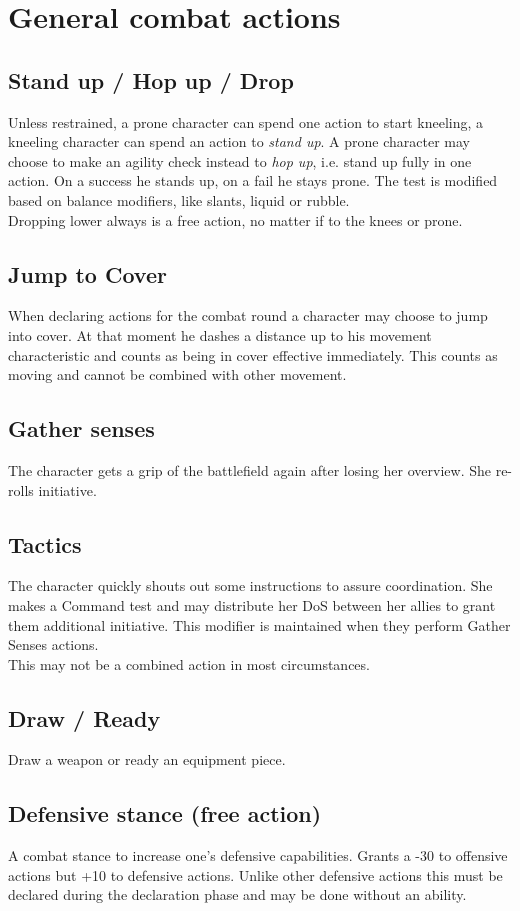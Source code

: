 \pagebreak
\section{General combat actions}
\subsection*{Stand up / Hop up / Drop}
Unless restrained, a prone character can spend one action to start kneeling, a kneeling character can spend an action to \emph{stand up}. A prone character may choose to make an agility check instead to \emph{hop up}, i.e. stand up fully in one action. On a success he stands up, on a fail he stays prone. The test is modified based on balance modifiers, like slants, liquid or rubble.\\
Dropping lower always is a free action, no matter if to the knees or prone.
\subsection*{Jump to Cover}
When declaring actions for the combat round a character may choose to jump into cover. At that moment he dashes a distance up to his movement characteristic and counts as being in cover effective immediately. This counts as moving and cannot be combined with other movement.
\subsection*{Gather senses}
The character gets a grip of the battlefield again after losing her overview. She re-rolls initiative.
\subsection*{Tactics}
The character quickly shouts out some instructions to assure coordination. She makes a Command test and may distribute her DoS between her allies to grant them additional initiative. This modifier is maintained when they perform Gather Senses actions.\\
This may not be a combined action in most circumstances.
\subsection*{Draw / Ready}
Draw a weapon or ready an equipment piece.
\subsection*{Defensive stance (free action)}
A combat stance to increase one’s defensive capabilities. Grants a -30 to offensive actions but +10 to defensive actions. Unlike other defensive actions this must be declared during the declaration phase and may be done without an ability.
